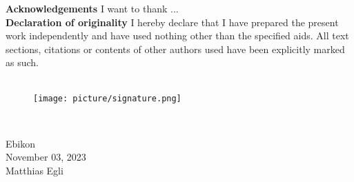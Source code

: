 
\vspace*{\fill}


\noindent\textbf{Acknowledgements} I want to thank ... \\


\noindent\textbf{Declaration of originality} I hereby declare that I have prepared the present work independently and have used nothing other than the specified aids. All text sections, citations or contents of other authors used have been explicitly marked as such.\\

\,

\begin{figure}[H]
    \centering
    \texttt{[image: picture/signature.png]}
\end{figure}

\,

\begin{center}
Ebikon\\
November 03, 2023\\
Matthias Egli
\end{center}
